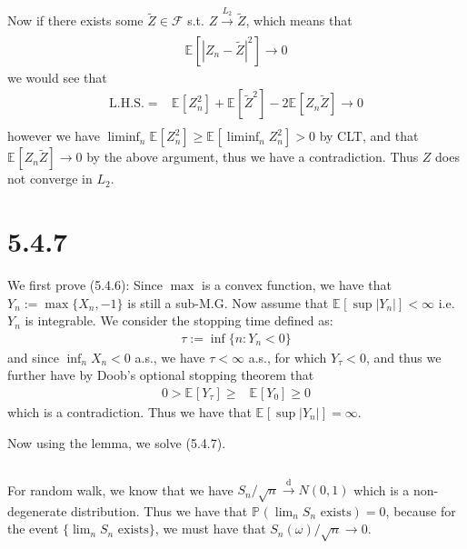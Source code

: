 \documentclass[11pt,a4paper]{ctexart}
\numberwithin{equation}{section}%
\newcommand{\F}{\mathcal{F}}
\begin{document}
Now if there exists some $ \tilde{Z} \in \F  $ s.t. $ Z\xrightarrow[]{L_2} \tilde{Z} $, which means that
\begin{align*}
    \mathbb{E}_{  }\left[ \left\vert Z_n-\tilde{Z} \right\vert ^2 \right] \to 0 
\end{align*}
we would see that
\begin{align*}
     \mathrm{L.H.S.} =& \mathbb{E}_{  }\left[ Z_n^2 \right] + \mathbb{E}_{  }\left[ \tilde{Z}^2 \right] - 2\mathbb{E}_{  }\left[ Z_n\tilde{Z} \right] \to 0\\
\end{align*}
however we have $ \liminf_n \mathbb{E}_{  }\left[ Z_n^2 \right]  \geq \mathbb{E}_{  }\left[ \liminf_n Z_n^2 \right] >0 $ by CLT, and that $ \mathbb{E}_{  }\left[ Z_n\tilde{Z} \right] \to 0 $ by the above argument, thus we have a contradiction. Thus $ Z $ does not converge in $ L_2 $. 



\section{5.4.7}

We first prove (5.4.6): Since $ \max $ is a convex function, we have that $ Y_n:=\max\{X_n,-1\} $ is still a sub-M.G. Now assume that $ \mathbb{E}_{  }\left[ \sup \left\vert Y_n \right\vert  \right]  <\infty $ i.e. $ Y_n $ is integrable. We consider the stopping time defined as:
\begin{align*}
    \tau:= \inf\{n: Y_n<0\} 
\end{align*}
and since $ \inf_n X_n <0 $ a.s., we have $ \tau <\infty $ a.s., for which $ Y_\tau <0 $, and thus we further have by Doob's optional stopping theorem that
\begin{align*}
    0>\mathbb{E}_{  }\left[ Y_\tau \right] \geq & \mathbb{E}_{  }\left[ Y_0 \right] \geq 0
\end{align*}
which is a contradiction. Thus we have that $ \mathbb{E}_{  }\left[ \sup \left\vert Y_n \right\vert  \right]  =\infty $.


Now using the lemma, we solve (5.4.7).

\subsection{}

For random walk, we know that we have $ S_n/\sqrt{n}\xrightarrow[]{\mathrm{d}} N(0,1) $ which is a non-degenerate distribution. Thus we have that $ \mathbb{P}_{  }\left( \lim_n S_n \text{ exists} \right)  = 0 $, because for the event $ \{\lim_n S_n \text{ exists}\} $, we must have that $ S_n(\omega )/\sqrt{n}\to 0 $. 
\end{document}

